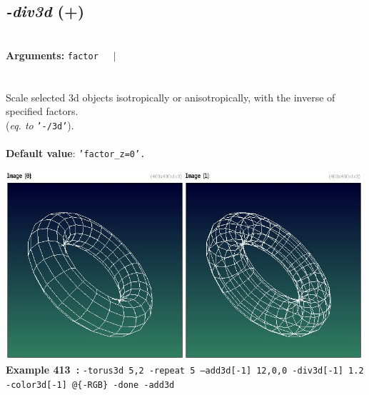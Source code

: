 \documentclass[a4paper,11pt,twoside]{book}
\begin{document}
\subsection{\emph{-div3d} (+)}\vspace*{-0.5em}
~\\\textbf{Arguments: } 
{\small \texttt{factor}}~~~$|$\\
\\~\\
Scale selected 3d objects isotropically or anisotropically, with the inverse of specified
factors.
~\\(\emph{eq. to} {\small \texttt{'-/3d'}}).
~\\~\\\textbf{Default value}: {\small \texttt{'factor\_z=0'.}}
\begin{center}\includegraphics[keepaspectratio=true,height=7cm,width=\textwidth]{img/gmic_def413.jpg}\\
{\footnotesize \textbf{Example 413~:} \texttt{-torus3d 5,2 -repeat 5 --add3d[-1] 12,0,0 -div3d[-1] 1.2 -color3d[-1] @\{-RGB\} -done -add3d}}
\end{center}
\end{document}
